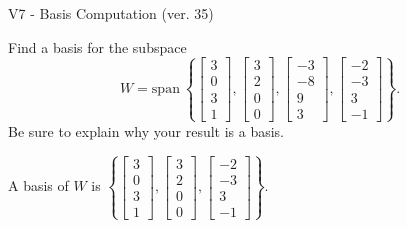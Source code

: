 \begin{exercise}
  \begin{exerciseTitle}V7 - Basis Computation (ver. 35)\end{exerciseTitle}
  \begin{exerciseStatement}
    Find a basis for the subspace 
\[W=\mathrm{span}\ \left\{\left[\begin{array}{r}
3 \\
0 \\
3 \\
1
\end{array}\right] , \left[\begin{array}{r}
3 \\
2 \\
0 \\
0
\end{array}\right] , \left[\begin{array}{r}
-3 \\
-8 \\
9 \\
3
\end{array}\right] , \left[\begin{array}{r}
-2 \\
-3 \\
3 \\
-1
\end{array}\right]\right\}.\]
 Be sure to explain why your result is a basis.


  \end{exerciseStatement}
  \begin{exerciseAnswer}
   A basis of \(W\) is  \(\left\{\left[\begin{array}{r}
3 \\
0 \\
3 \\
1
\end{array}\right] , \left[\begin{array}{r}
3 \\
2 \\
0 \\
0
\end{array}\right] , \left[\begin{array}{r}
-2 \\
-3 \\
3 \\
-1
\end{array}\right]\right\}\).
  


  \end{exerciseAnswer}
\end{exercise}